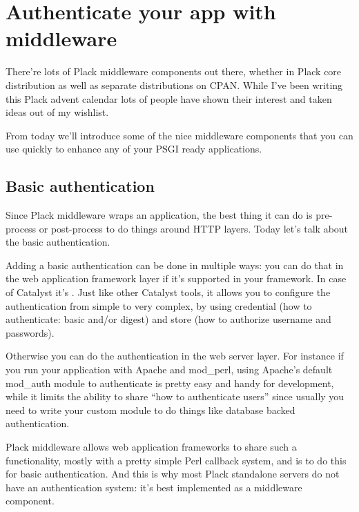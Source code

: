 \chapter{Authenticate your app with middleware}
\label{day-15-authenticate-your-app-with-middleware}

There're lots of Plack middleware components out there, whether in Plack
core distribution as well as separate distributions on CPAN. While I've
been writing this Plack advent calendar lots of people have shown their
interest and taken ideas out of my wishlist.

From today we'll introduce some of the nice middleware components that
you can use quickly to enhance any of your PSGI ready applications.

\section{Basic authentication}\label{basic-authentication}

Since Plack middleware wraps an application, the best thing it can do is
pre-process or post-process to do things around HTTP layers. Today let's
talk about the basic authentication.

Adding a basic authentication can be done in multiple ways: you can do
that in the web application framework layer if it's supported in your
framework. In case of Catalyst it's
\href{http://search.cpan.org/perldoc?Catalyst::Authentication::Credential::HTTP}{}.
Just like other Catalyst tools, it allows you to configure the
authentication from simple to very complex, by using credential (how to
authenticate: basic and/or digest) and store (how to authorize username
and passwords).

Otherwise you can do the authentication in the web server layer. For
instance if you run your application with Apache and mod\_perl, using
Apache's default mod\_auth module to authenticate is pretty easy and
handy for development, while it limits the ability to share ``how to
authenticate users'' since usually you need to write your custom module
to do things like database backed authentication.

Plack middleware allows web application frameworks to share such a
functionality, mostly with a pretty simple Perl callback system, and
 is to do this for basic authentication.
And this is why most Plack standalone servers do not have an
authentication system: it's best implemented as a middleware component.

